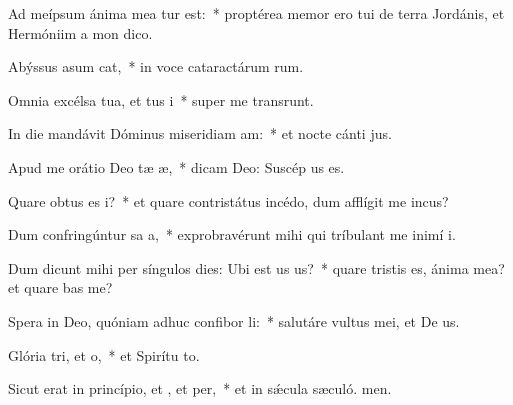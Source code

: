 \item Ad meípsum ánima mea tur est:~* proptérea memor ero tui de terra Jordánis, et Hermóniim a mon dico.
\item Abýssus asum cat,~* in voce cataractárum rum.
\item Omnia excélsa tua, et tus i~* super me transrunt.
\item In die mandávit Dóminus miseridiam am:~* et nocte cánti jus.
\item Apud me orátio Deo tæ æ,~* dicam Deo: Suscép us es.
\item Quare obtus es i?~* et quare contristátus incédo, dum afflígit me incus?
\item Dum confringúntur sa a,~* exprobravérunt mihi qui tríbulant me inimí i.
\item Dum dicunt mihi per síngulos dies: Ubi est us us?~* quare tristis es, ánima mea? et quare bas me?
\item Spera in Deo, quóniam adhuc confibor li:~* salutáre vultus mei, et De us.
\item Glória tri, et o,~* et Spirítu to.
\item Sicut erat in princípio, et , et per,~* et in sǽcula sæculó. men.
